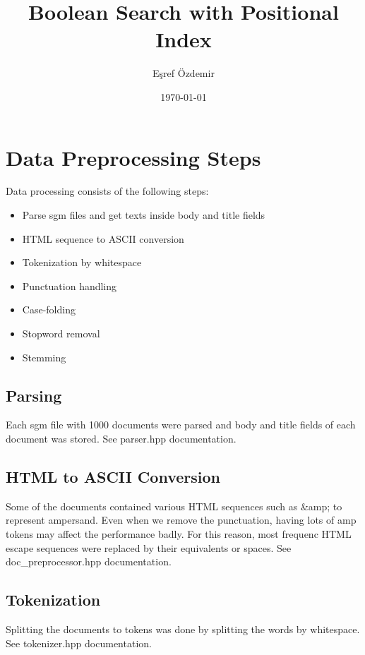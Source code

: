 \documentclass{article}
\begin{document}
\title{Boolean Search with Positional Index}
\author{Eşref Özdemir}
\date{\today}

\maketitle
\tableofcontents

\newpage

\section{Data Preprocessing Steps}
Data processing consists of the following steps:

\begin{itemize}
	\item Parse sgm files and get texts inside body and title fields
	\item HTML sequence to ASCII conversion
	\item Tokenization by whitespace
	\item Punctuation handling
	\item Case-folding
	\item Stopword removal
	\item Stemming
\end{itemize}

\subsection{Parsing}
Each sgm file with 1000 documents were parsed and body and title fields of each
document was stored. See parser.hpp documentation.

\subsection{HTML to ASCII Conversion}
Some of the documents contained various HTML sequences such as \&amp; to
represent ampersand. Even when we remove the punctuation, having lots of amp
tokens may affect the performance badly. For this reason, most frequenc HTML
escape sequences were replaced by their equivalents or spaces. See
doc\_preprocessor.hpp documentation.

\subsection{Tokenization}
Splitting the documents to tokens was done by splitting the words by whitespace.
See tokenizer.hpp documentation.
\end{document}

